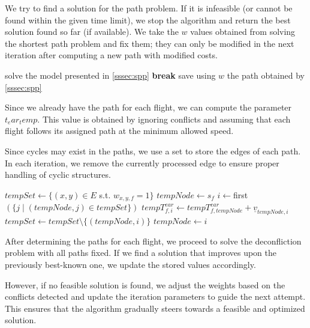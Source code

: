 \documentclass[../thesis.tex]{subfiles}
\begin{document}
We try to find a solution for the path problem. If it is infeasible (or cannot be found within the given time limit), we stop the algorithm and return the best solution found so far (if available).
We take the $w$ values obtained from solving the shortest path problem and fix them; they can only be modified in the next iteration after computing a new path with modified costs.

\begin{algorithm}[H]
\begin{algorithmic}
    \STATE solve the model presented in \ref{sssec:spp}
        \STATE \textbf{break}
    \ENDIF
    \STATE save using $w$ the path obtained by \ref{sssec:spp}
\end{algorithmic}
\end{algorithm}

Since we already have the path for each flight, we can compute the parameter $t_ear_temp$. This value is obtained by ignoring conflicts and assuming that each flight follows its assigned path at the minimum allowed speed.

Since cycles may exist in the paths, we use a set to store the edges of each path. In each iteration, we remove the currently processed edge to ensure proper handling of cyclic structures.

\begin{algorithm}[H]
\begin{algorithmic}
    \STATE $tempSet\gets \{(x,y)\in E$ s.t. $w_{x,y,f}=1\}$
    \STATE $tempNode\gets s_f$
    \STATE $i\gets $first$(\{ j \mid (tempNode, j) \in tempSet \})$
    \STATE $tempT^{ear}_{f,i}\gets tempT^{ear}_{f,tempNode}+\underline v_{tempNode,i}$
    \STATE $tempSet\gets tempSet\setminus\{(tempNode,i)\}$
    \STATE $tempNode\gets i$
    \ENDWHILE
    \ENDFOR
\end{algorithmic}
\end{algorithm}

After determining the paths for each flight, we proceed to solve the deconfliction problem with all paths fixed. If we find a solution that improves upon the previously best-known one, we update the stored values accordingly.

However, if no feasible solution is found, we adjust the weights based on the conflicts detected and update the iteration parameters to guide the next attempt. This ensures that the algorithm gradually steers towards a feasible and optimized solution.
\end{document}
